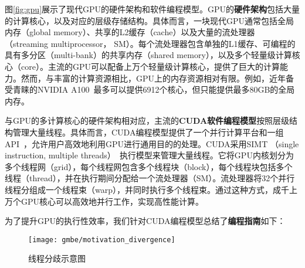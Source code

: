 图\ref{fig:gpu}展示了现代GPU的硬件架构和软件编程模型。GPU的\textbf{硬件架构}包括大量的计算核心，以及对应的层级存储结构。具体而言，一块现代GPU通常包括全局内存（global memory）、共享的L2缓存（cache）以及大量的流处理器 （streaming multiprocessor， SM）。每个流处理器包含单独的L1缓存、可编程的具有多分区（multi-bank）的共享内存（shared memory），以及多个轻量级计算核心（core）。主流的GPU可以配备上万个轻量级计算核心，提供了巨大的计算能力。然而，与丰富的计算资源相比，GPU上的内存资源相对有限。例如，近年备受青睐的NVIDIA A100~\cite{NVIDIA-A100}最多可以提供6912个核心，但只能提供最多80GB的全局内存。

与GPU的多计算核心的硬件架构相对应，主流的\textbf{CUDA软件编程模型}按照层级结构管理大量线程。具体而言，CUDA编程模型提供了一个并行计算平台和一组API~\cite{CUDA-wiki,CUDAProgrammingGuide}，允许用户高效地利用GPU进行通用目的的处理。CUDA采用SIMT （single instruction, multiple threads）~\cite{SIMT-wiki}执行模型来管理大量线程。它将GPU内核划分为多个线程网（grid），每个线程网包含多个线程块（block），每个线程块包括多个线程（thread），并在执行期间分配给一个流处理器（SM）。流处理器将32个并行线程分组成一个线程束（warp），并同时执行多个线程束。通过这种方式，成千上万个GPU核心可以高效地并行工作，实现高性能计算。




为了提升GPU的执行性效率，我们针对CUDA编程模型总结了\textbf{编程指南}如下：

\begin{figure} [t]
  \center
		\texttt{[image: gmbe/motivation\_divergence]}
	\caption{线程分歧示意图}
	\label{fig:gmbe_motivation_divergence}
\end{figure}



